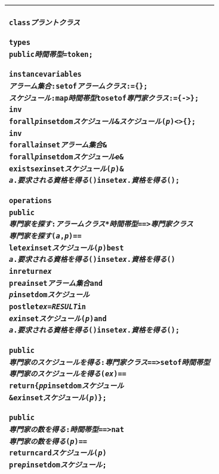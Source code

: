 \documentclass[\pformat,12pt,twoside]{jarticle}
\newenvironment{VDMgray}%
{\begin{tabular}{|G|}\hline\small\begin{alltt}}%
{\end{alltt}\normalsize\\
 \hline\end{tabular}}
\begin{document}
\begin{VDMgray}
\textbf{class} \textit{プラントクラス}

\textbf{types}
 \textbf{public} \textit{時間帯型} = \textbf{token};

\textbf{instance} \textbf{variables}
 \textit{アラーム集合} : \textbf{set} \textbf{of} \textit{アラームクラス} := \{\};
 \textit{スケジュール} : \textbf{map} \textit{時間帯型} \textbf{to} \textbf{set} \textbf{of} \textit{専門家クラス} := \{{\textbar}-\texttt{>}\};
 \textbf{inv}
   \textbf{forall} \textit{p} \textbf{in set} \textbf{dom} \textit{スケジュール} \& \textit{スケジュール}(\textit{p}) \texttt{<}\texttt{>} \{\};
 \textbf{inv}
   \textbf{forall} \textit{a} \textbf{in set} \textit{アラーム集合} \&
      \textbf{forall} \textit{p} \textbf{in set} \textbf{dom} \textit{スケジュールe} \&
         \textbf{exists} \textit{ex} \textbf{in set} \textit{スケジュール}(\textit{p}) \&
            \textit{a}.\textit{要求される資格を得る}() \textbf{in set} \textit{ex}.\textit{資格を得る}();

\textbf{operations}
 \textbf{public}
 \textit{専門家を探す} : \textit{アラームクラス} * \textit{時間帯型} ==\texttt{>} \textit{専門家クラス}
 \textit{専門家を探す}(\textit{a}, \textit{p}) ==
   \textbf{let} \textit{ex} \textbf{in set} \textit{スケジュール}(\textit{p}) \textbf{be} \textbf{st}
       \textit{a}.\textit{要求される資格を得る}() \textbf{in set} \textit{ex}.\textit{資格を得る}()
   \textbf{in} \textbf{return} \textit{ex}
 \textbf{pre} \textit{a} \textbf{in set} \textit{アラーム集合} \textbf{and}
     \textit{p} \textbf{in set} \textbf{dom} \textit{スケジュール}
 \textbf{post} \textbf{let} \textit{ex} = \textit{RESULT} \textbf{in}
       \textit{ex} \textbf{in set} \textit{スケジュール}(\textit{p}) \textbf{and}
       \textit{a}.\textit{要求される資格を得る}() \textbf{in set} \textit{ex}.\textit{資格を得る}();

 \textbf{public}
 \textit{専門家のスケジュールを得る} : \textit{専門家クラス} ==\texttt{>} \textbf{set} \textbf{of} \textit{時間帯型}
 \textit{専門家のスケジュールを得る}(\textit{ex}) ==
   \textbf{return} \{\textit{p} {\textbar} \textit{p} \textbf{in set} \textbf{dom} \textit{スケジュール} 
             \& \textit{ex} \textbf{in set} \textit{スケジュール}(\textit{p})\};

 \textbf{public}
 \textit{専門家の数を得る} : \textit{時間帯型} ==\texttt{>} \textbf{nat}
 \textit{専門家の数を得る}(\textit{p}) ==
  {\color{red} \textbf{return} \textbf{card} \textit{スケジュール} ( \textit{p} )}
  \textbf{pre} {\color{red} \textit{p} \textbf{in set} \textbf{dom} \textit{スケジュール}};
\end{VDMgray}
\end{document}
